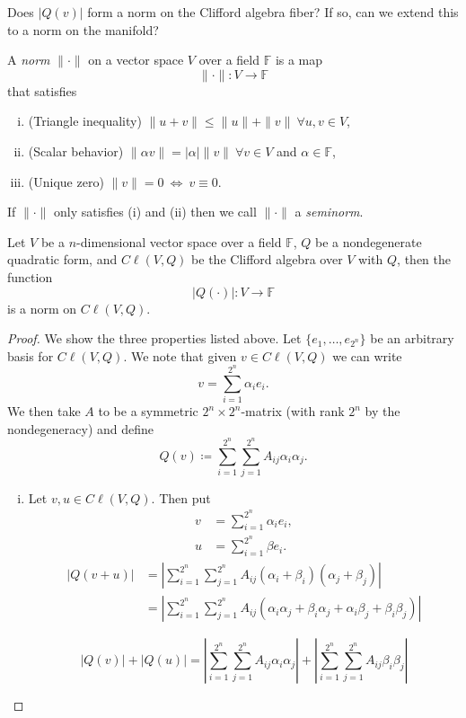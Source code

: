 \begin{question}
Does $|Q(v)|$ form a norm on the Clifford algebra fiber? If so, can we extend this to a norm on the manifold?
\end{question}

\begin{definition}
A \emph{norm} $\|\cdot\|$ on a vector space $V$ over a field $\mathbb{F}$ is a map
\[
\|\cdot \| \colon V \to \mathbb{F}
\]
that satisfies
\begin{enumerate}[(i)]
    \item (Triangle inequality) $\|u+v\|\leq \|u\|+\|v\|~\forall u,v\in V$,
    \item (Scalar behavior) $\|\alpha v\| = |\alpha|\|v\|~\forall v\in V$ and $\alpha \in \mathbb{F}$,
    \item (Unique zero) $\|v\|=0 ~\iff~ v\equiv 0$.
\end{enumerate}
If $\|\cdot \|$ only satisfies (i) and (ii) then we call $\|\cdot \|$ a \emph{seminorm}.
\end{definition}

\begin{proposition}
Let $V$ be a $n$-dimensional vector space over a field $\mathbb{F}$, $Q$ be a nondegenerate quadratic form, and $C\ell(V,Q)$ be the Clifford algebra over $V$ with $Q$, then the function
\[
|Q(\cdot)| \colon V \to \mathbb{F}
\]
is a norm on $C\ell(V,Q)$.
\end{proposition}

\begin{proof}
We show the three properties listed above.  Let $\{e_1,\dots,e_{2^n}\}$ be an arbitrary basis for $C\ell(V,Q)$. We note that given $v \in C\ell(V,Q)$ we can write
\[
v=\sum_{i=1}^{2^n} \alpha_i e_i.
\]
We then take $A$ to be a symmetric $2^n\times 2^n$-matrix (with rank $2^n$ by the nondegeneracy) and define
\[
Q(v)\coloneqq \sum_{i=1}^{2^n} \sum_{j=1}^{2^n} A_{ij}\alpha_i \alpha_j.
\]
\begin{enumerate}[(i)]
    \item Let $v,u \in C\ell(V,Q)$.  Then put
    \begin{align*}
        v &= \sum_{i=1}^{2^n} \alpha_i e_i,\\
        u &= \sum_{i=1}^{2^n} \beta e_i.
    \end{align*}
    \begin{align*}
    |Q(v+u)|&=\left|\sum_{i=1}^{2^n} \sum_{j=1}^{2^n} A_{ij}(\alpha_i+\beta_i) (\alpha_j+\beta_j)\right|\\
    &= \left|\sum_{i=1}^{2^n} \sum_{j=1}^{2^n} A_{ij}(\alpha_i \alpha_j +\beta_i \alpha_j+ \alpha_i\beta_j +\beta_i\beta_j)\right|
    \end{align*}
    
    \[
    |Q(v)|+|Q(u)| = \left|\sum_{i=1}^{2^n} \sum_{j=1}^{2^n} A_{ij}\alpha_i \alpha_j\right| + \left|\sum_{i=1}^{2^n} \sum_{j=1}^{2^n} A_{ij}\beta_i \beta_j\right|
    \]
\end{enumerate}
\end{proof}

